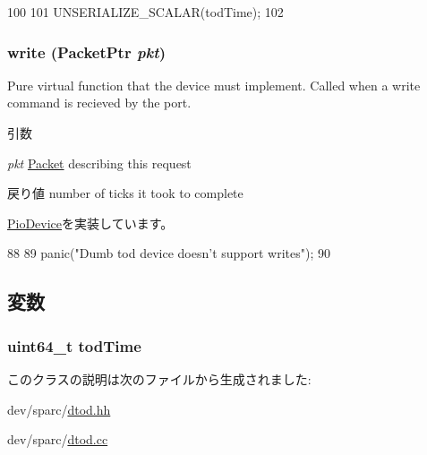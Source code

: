 \begin{DoxyCode}
100 {
101     UNSERIALIZE_SCALAR(todTime);
102 }
\end{DoxyCode}
\hypertarget{classDumbTOD_a4cefab464e72b5dd42c003a0a4341802}{
\subsubsection[{write}]{ write ({\bf PacketPtr} {\em pkt})}}
\label{classDumbTOD_a4cefab464e72b5dd42c003a0a4341802}
Pure virtual function that the device must implement. Called when a write command is recieved by the port. 
\begin{DoxyParams}{引数}
\item[{\em pkt}]\hyperlink{classPacket}{Packet} describing this request \end{DoxyParams}
\begin{DoxyReturn}{戻り値}
number of ticks it took to complete 
\end{DoxyReturn}


\hyperlink{classPioDevice_afe8371668d023bb2516b286e5e399b6f}{PioDevice}を実装しています。


\begin{DoxyCode}
88 {
89     panic("Dumb tod device doesn't support writes\n");
90 }
\end{DoxyCode}


\subsection{変数}
\hypertarget{classDumbTOD_a7823975262c83092e897cd60ec42b072}{
\subsubsection[{todTime}]{\setlength{\rightskip}{0pt plus 5cm}uint64\_\-t {\bf todTime}}}
\label{classDumbTOD_a7823975262c83092e897cd60ec42b072}


このクラスの説明は次のファイルから生成されました:\begin{DoxyCompactItemize}
\item 
dev/sparc/\hyperlink{dtod_8hh}{dtod.hh}\item 
dev/sparc/\hyperlink{dtod_8cc}{dtod.cc}\end{DoxyCompactItemize}
